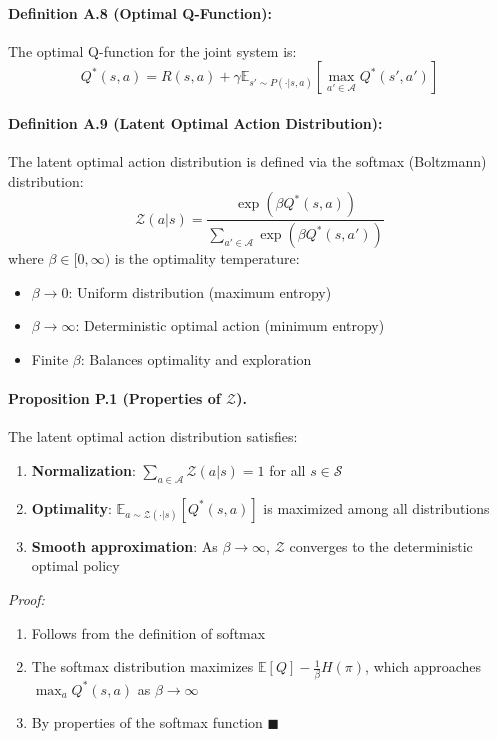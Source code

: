 \documentclass[10pt, letterpaper]{article}
\begin{document}
\paragraph{Definition A.8 (Optimal Q-Function):} The optimal Q-function for the joint system is:
\[Q^*(s, a) = R(s, a) + \gamma \mathbb{E}_{s' \sim P(\cdot|s,a)} \left[ \max_{a' \in \mathcal{A}} Q^*(s', a') \right]\]

\paragraph{Definition A.9 (Latent Optimal Action Distribution):} The latent optimal action distribution is defined via the softmax (Boltzmann) distribution:
\[\mathcal{Z}(a|s) = \frac{\exp(\beta Q^*(s,a))}{\sum_{a' \in \mathcal{A}} \exp(\beta Q^*(s,a'))}\]
where $\beta \in [0, \infty)$ is the optimality temperature:
\begin{itemize}
    \item $\beta \to 0$: Uniform distribution (maximum entropy)
    \item $\beta \to \infty$: Deterministic optimal action (minimum entropy)
    \item Finite $\beta$: Balances optimality and exploration
\end{itemize}

\paragraph{Proposition P.1 (Properties of $\mathcal{Z}$).} The latent optimal action distribution satisfies:
\begin{enumerate}
    \item \textbf{Normalization}: $\sum_{a \in \mathcal{A}} \mathcal{Z}(a|s) = 1$ for all $s \in \mathcal{S}$
    \item \textbf{Optimality}: $\mathbb{E}_{a \sim \mathcal{Z}(\cdot|s)}[Q^*(s,a)]$ is maximized among all distributions
    \item \textbf{Smooth approximation}: As $\beta \to \infty$, $\mathcal{Z}$ converges to the deterministic optimal policy
\end{enumerate}
\emph{Proof:}
\begin{enumerate}
    \item Follows from the definition of softmax
    \item The softmax distribution maximizes $\mathbb{E}[Q] - \frac{1}{\beta}H(\pi)$, which approaches $\max_a Q^*(s,a)$ as $\beta \to \infty$
    \item By properties of the softmax function $\blacksquare$
\end{enumerate}
\end{document}
